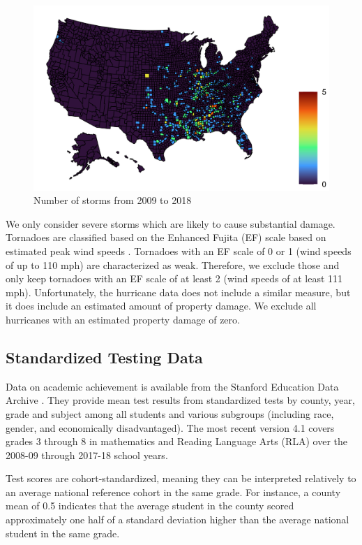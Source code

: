 \begin{figure}[!h]
	\centering
	\includegraphics[scale=1]{"../Code & Data/StormMap.png"}
	\caption{Number of storms from 2009 to 2018}
	\label{StormMap}
\end{figure}

We only consider severe storms which are likely to cause substantial damage. Tornadoes are classified based on the Enhanced Fujita (EF) scale based on estimated peak wind speeds \citep[for more details see][]{EF_Scale}. Tornadoes with an EF scale of 0 or 1 (wind speeds of up to 110 mph) are characterized as weak. Therefore, we exclude those and only keep tornadoes with an EF scale of at least 2 (wind speeds of at least 111 mph). Unfortunately, the hurricane data does not include a similar measure, but it does include an estimated amount of property damage. We exclude all hurricanes with an estimated property damage of zero.


\subsection{Standardized Testing Data}

Data on academic achievement is available from the Stanford Education Data Archive \citep{SEDA}. They provide mean test results from standardized tests by county, year, grade and subject among all students and various subgroups (including race, gender, and economically disadvantaged). The most recent version 4.1 covers grades 3 through 8 in mathematics and Reading Language Arts (RLA) over the 2008-09 through 2017-18 school years.

Test scores are cohort-standardized, meaning they can be interpreted relatively to an average national reference cohort in the same grade. For instance, a county mean of 0.5 indicates that the average student in the county scored approximately one half of a standard deviation higher than the average national student in the same grade.

